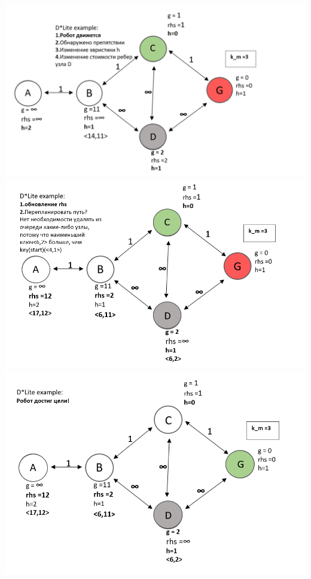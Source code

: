 \documentclass[12pt]{article}
\begin{document}
\begin{center}
         \includegraphics[width=1\textwidth]{img/example7.png}
         \includegraphics[width=1\textwidth]{img/example7_1.png}
         \includegraphics[width=1\textwidth]{img/example8.png}
    \end{center}
\end{document}
